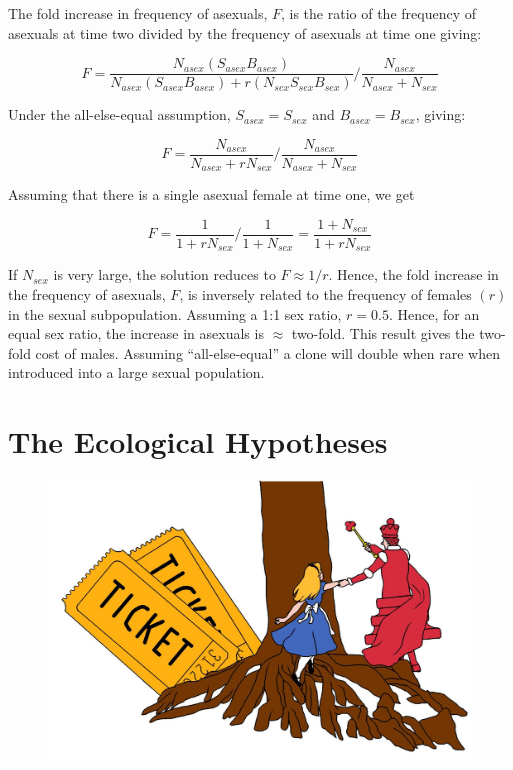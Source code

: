 \documentclass[
  letterpaper,
]{book}
\begin{document}
\begin{tcolorbox}
The fold increase in frequency of asexuals, \(F\), is the ratio of the
frequency of asexuals at time two divided by the frequency of asexuals
at time one giving:

\[F = \frac{N_{asex}(S_{asex}B_{asex})}{N_{asex}(S_{asex}B_{asex}) + r(N_{sex}S_{sex}B_{sex})}/\frac{N_{asex}}{N_{asex} + N_{sex}}\]

Under the all-else-equal assumption, \(S_{asex} = S_{sex}\) and
\(B_{asex} = B_{sex}\), giving:

\[F = \frac{N_{asex}}{N_{asex} + rN_{sex}}/\frac{N_{asex}}{N_{asex} + N_{sex}}\]

Assuming that there is a single asexual female at time one, we get

\[F = \frac{1}{1 + rN_{sex}}/\frac{1}{1 + N_{sex}} = \frac{1 + N_{sex}}{1 + rN_{sex}}\]

If \(N_{sex}\) is very large, the solution reduces to \(F \approx 1/r\).
Hence, the fold increase in the frequency of asexuals, \(F\), is
inversely related to the frequency of females \((r)\) in the sexual
subpopulation. Assuming a 1:1 sex ratio, \(r = 0.5\). Hence, for an
equal sex ratio, the increase in asexuals is \(\approx\) two-fold. This
result gives the two-fold cost of males. Assuming ``all-else-equal'' a
clone will double when rare when introduced into a large sexual
population.

\end{tcolorbox}


\hypertarget{sec-eco-hyp}{%
\chapter{The Ecological Hypotheses}\label{sec-eco-hyp}}

\begin{figure}

{\centering \includegraphics{images/fig2-1.jpeg}

}

\end{figure}
\end{document}
